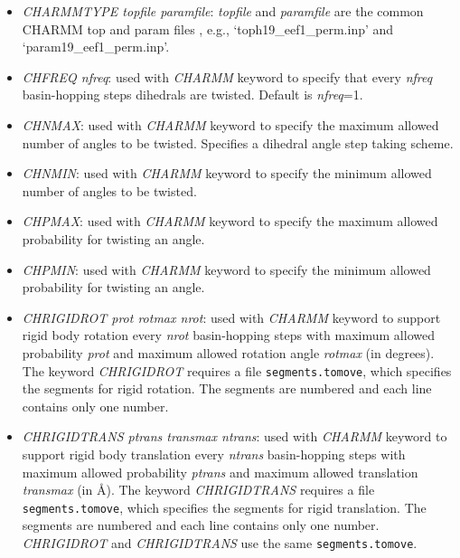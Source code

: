 \documentclass[12pt,a4paper,dvips]{article}
\begin{document}
\begin{itemize}
\item {\it CHARMMTYPE topfile paramfile\/}:  {\it topfile} and {\it paramfile} are the
common CHARMM top and param files , e.g., `toph19\_eef1\_perm.inp' and `param19\_eef1\_perm.inp'.

\item{\it CHFREQ nfreq}: used with {\it CHARMM} keyword to specify that every
{\it nfreq} basin-hopping steps dihedrals are twisted. Default is {\it nfreq}=1.

\item{\it CHNMAX}: used with {\it CHARMM} keyword to specify the maximum allowed
number of angles to be twisted. Specifies a dihedral angle step taking scheme. 

\item{\it CHNMIN}: used with {\it CHARMM} keyword to specify the minimum allowed
number of angles to be twisted.

\item{\it CHPMAX}: used with {\it CHARMM} keyword to specify the maximum allowed
probability for twisting an angle.

\item{\it CHPMIN}: used with {\it CHARMM} keyword to specify the minimum allowed
probability for twisting an angle.

\item{\it CHRIGIDROT prot rotmax nrot}: used with {\it CHARMM} keyword 
to support rigid body rotation every {\it nrot} basin-hopping steps with maximum allowed 
probability {\it prot} and maximum allowed rotation angle {\it rotmax} (in degrees). 
The keyword {\it CHRIGIDROT} requires a file {\tt segments.tomove}, which specifies
the segments for rigid rotation. The segments are numbered and each line contains only one number.

\item{\it CHRIGIDTRANS ptrans transmax ntrans}: used with {\it CHARMM} keyword 
to support rigid body translation every {\it ntrans} basin-hopping steps with maximum allowed 
probability {\it ptrans} and maximum allowed translation {\it transmax} (in \AA). 
The keyword {\it CHRIGIDTRANS} requires a file {\tt segments.tomove}, which specifies
the segments for rigid translation. The segments are numbered and each line contains only one number.
{\it CHRIGIDROT} and {\it CHRIGIDTRANS} use the same {\tt segments.tomove}.



\end{itemize}
\end{document}
